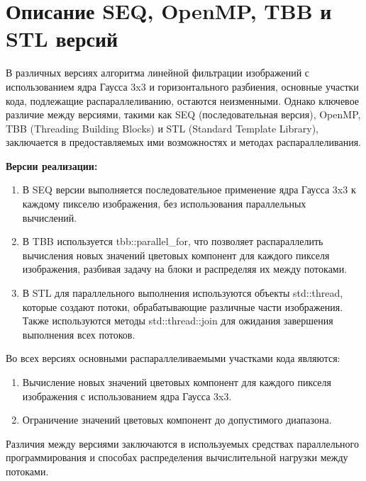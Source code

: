 \documentclass{report}
\begin{document}
\newpage

\section* {Описание SEQ, OpenMP, TBB и STL версий}
\par В различных версиях алгоритма линейной фильтрации изображений с использованием ядра Гаусса 3x3 и горизонтального разбиения, основные участки кода, подлежащие распараллеливанию, остаются неизменными. Однако ключевое различие между версиями, такими как SEQ (последовательная версия), OpenMP, TBB (Threading Building Blocks) и STL (Standard Template Library), заключается в предоставляемых ими возможностях и методах распараллеливания.

\par \textbf{Версии реализации:}
\begin{enumerate}
\item В SEQ версии выполняется последовательное применение ядра Гаусса 3x3 к каждому пикселю изображения, без использования параллельных вычислений.

\item В TBB используется tbb::parallel\_for, что позволяет распараллелить вычисления новых значений цветовых компонент для каждого пикселя изображения, разбивая задачу на блоки и распределяя их между потоками.

\item В STL для параллельного выполнения используются объекты std::thread, которые создают потоки, обрабатывающие различные части изображения. Также используются методы std::thread::join для ожидания завершения выполнения всех потоков.
\end{enumerate}

\par Во всех версиях основными распараллеливаемыми участками кода являются:
\begin{enumerate}
\item Вычисление новых значений цветовых компонент для каждого пикселя изображения с использованием ядра Гаусса 3x3.
\item Ограничение значений цветовых компонент до допустимого диапазона.
\end{enumerate}

\par Различия между версиями заключаются в используемых средствах параллельного программирования и способах распределения вычислительной нагрузки между потоками.

\newpage
\end{document}
